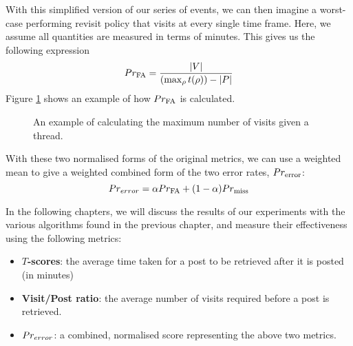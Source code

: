 With this simplified version of our series of events, we can then imagine a 
worst-case performing revisit policy that visits at every single time frame.  
Here, we assume all quantities are measured in terms of minutes. This gives us 
the following expression
\[
	\P_{\text{FA}} = \frac{|V|}{(\max_{\post}t(\post)) - |P|}
\]
Figure \ref{fig:norm_fa_score} shows an example of how $\P_{\text{FA}}$ is 
calculated.

\begin{figure}
\begin{center}
	
\end{center}
\caption{An example of calculating the maximum number of visits given a thread.  
}
\label{fig:norm_fa_score}
\end{figure}


With these two normalised forms of the original metrics, we can use a weighted 
mean to give a weighted combined form of the two error rates, 
$\P_{\text{error}}$:
\[
	\prerror = \alpha\P_{\text{FA}} + (1-\alpha)\P_{\text{miss}}
\]


In the following chapters, we will discuss the results of our experiments with 
the various algorithms found in the previous chapter, and measure their 
effectiveness using the following metrics:
\begin{itemize}
	\item \textbf{$T$-scores}: the average time taken for a post to be retrieved 
		after it is posted (in minutes)
	\item \textbf{Visit/Post ratio}: the average number of visits required 
		before a post is retrieved.
	\item $\prerror$: a combined, normalised score representing the above two 
		metrics.
\end{itemize}

